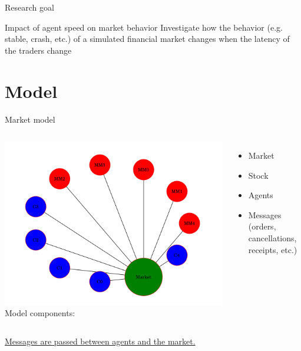 \documentclass[14pt]{beamer}
\begin{document}
\begin{frame}{Research goal}
\begin{block}{Impact of agent speed on market behavior}
Investigate how the behavior (e.g. stable, crash, etc.) of a simulated financial market changes when the latency of the traders change
\end{block}
\end{frame}


%






\section{Model}
\begin{frame}
\tableofcontents[currentsection]
\end{frame}

\begin{frame}{Market model}
\begin{columns}[c]
\column{2.5in}
\includegraphics[width=1.2\textwidth]{graph.png}
\column{2in}
Model components:
\begin{itemize}
\item Market
\item Stock
\item Agents
\item Messages (orders, cancellations, receipts, etc.)
\end{itemize}
\end{columns}
\pause
\underline{Messages are passed between agents and the market.}
\end{frame}
\end{document}
